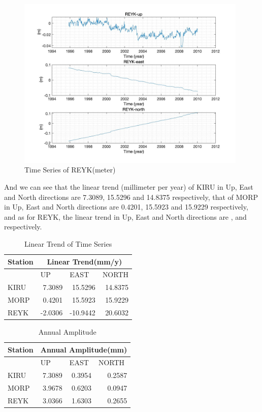 \documentclass{article}
\begin{document}
\begin{figure}[htbp]
  \centering
  \includegraphics[width=11cm]{../result/re_figure/fig_REYK/figure1.jpg}
  \caption{Time Series of REYK(meter)}
  \label{fig:Ori_REYK}
\end{figure}

And we can see that the linear trend (millimeter per year) of KIRU in Up, East and North directions are 7.3089, 15.5296 and 14.8375 respectively, 
 that of MORP in Up, East and North directions are 0.4201, 15.5923 and 15.9229 respectively,
 and as for REYK, the linear trend in Up, East and North directions are ,  and  respectively.
 \vspace{6pt}
\begin{table}[H]
  \centering
  \caption{Linear Trend of Time Series}
    \begin{tabular}{lrrr}
    \large Station & \multicolumn{3}{c}{\large Linear Trend(mm/y)} \\
    \midrule
          &\multicolumn{1}{l}{\large UP} & \multicolumn{1}{l}{\large EAST} & \multicolumn{1}{l}{\large NORTH} \\ [5pt]
          
     KIRU&7.3089 & 15.5296 & 14.8375\\[3pt]
     MORP&0.4201 & 15.5923 & 15.9229\\ [3pt]
     REYK&-2.0306 & -10.9442 & 20.6032\\
    \end{tabular}%
  \label{Tab:lin_trend}%
\end{table}

\begin{table}[H]
  \centering
  \caption{Annual Amplitude}
    \begin{tabular}{lrrr}
    \large Station & \multicolumn{3}{c}{\large Annual Amplitude(mm)} \\
    \midrule
          &\multicolumn{1}{l}{\large UP} & \multicolumn{1}{l}{\large EAST} & \multicolumn{1}{l}{\large NORTH} \\ [5pt]
          
     KIRU&7.3089 & 0.3954 & 0.2587\\[3pt]
     MORP&3.9678 & 0.6203 & 0.0947\\ [3pt]
     REYK&3.0366 & 1.6303 & 0.2655\\
    \end{tabular}%
  \label{Tab:amplitude}%
\end{table}
\end{document}
